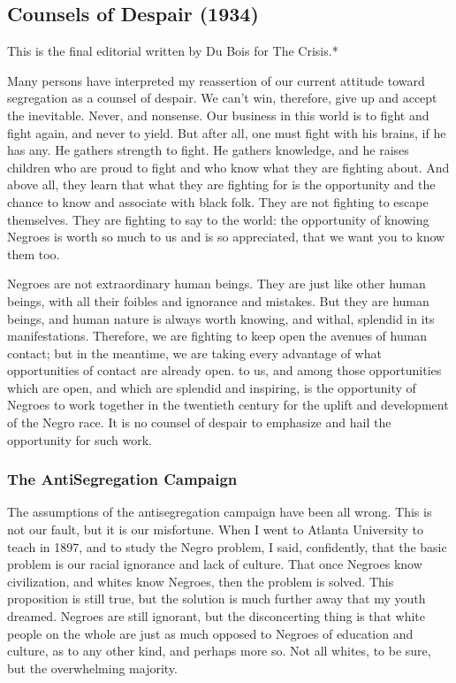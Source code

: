 \documentclass[letterpaper,10pt,english]{jupyterBook}
\begin{document}
\subsection{Counsels of Despair (1934)}
\label{\detokenize{Volumes/41/06/counsels_of_despair:counsels-of-despair-1934}}\label{\detokenize{Volumes/41/06/counsels_of_despair::doc}}
\begin{sphinxShadowBox}
\sphinxstylesidebartitle{}

\sphinxAtStartPar
This is the final editorial written by Du Bois for The Crisis.*
\end{sphinxShadowBox}

\sphinxAtStartPar
Many persons have interpreted my reassertion of our current attitude toward segregation as a counsel of despair. We can’t win, therefore, give up and accept the inevitable. Never, and nonsense. Our business in this world is to fight and fight again, and never to yield. But after all, one must fight with his brains, if he has any. He gathers strength to fight. He gathers knowledge, and he raises children who are proud to fight and who know what they are fighting about. And above all, they learn that what they are fighting for is the opportunity and the chance to know and associate with black folk. They are not fighting to escape themselves. They are fighting to say to the world: the opportunity of knowing Negroes is worth so much to us and is so appreciated, that we want you to know them too.

\sphinxAtStartPar
Negroes are not extraordinary human beings. They are just like other human beings, with all their foibles and ignorance and mistakes. But they are human beings, and human nature is always worth knowing, and withal, splendid in its manifestations. Therefore, we are fighting to keep open the avenues of human contact; but in the meantime, we are taking every advantage of what opportunities of contact are already open. to us, and among those opportunities which are open, and which are splendid and inspiring, is the opportunity of Negroes to work together in the twentieth century for the uplift and development of the Negro race. It is no counsel of despair to emphasize and hail the opportunity for such work.


\subsubsection{The Anti\sphinxhyphen{}Segregation Campaign}
\label{\detokenize{Volumes/41/06/counsels_of_despair:the-anti-segregation-campaign}}
\sphinxAtStartPar
The assumptions of the anti\sphinxhyphen{}segregation campaign have been all wrong. This is not our fault, but it is our misfortune. When I went to Atlanta University to teach in 1897, and to study the Negro problem, I said, confidently, that the basic problem is our racial ignorance and lack of culture. That once Negroes know civilization, and whites know Negroes, then the problem is solved. This proposition is still true, but the solution is much further away that my youth dreamed. Negroes are still ignorant, but the disconcerting thing is that white people on the whole are just as much opposed to Negroes of education and culture, as to any other kind, and perhaps more so. Not all whites, to be sure, but the overwhelming majority.
\end{document}
